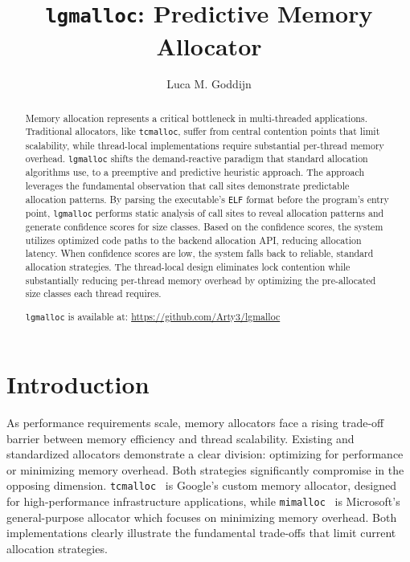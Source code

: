 \documentclass[sigconf,authordraft]{acmart}
\begin{document}

\title{\texttt{lgmalloc}: Predictive Memory Allocator}

\author{Luca M. Goddijn}

\begin{abstract}
  Memory allocation represents a critical bottleneck in multi-threaded applications.
  Traditional allocators, like \texttt{tcmalloc}, suffer from central contention points
  that limit scalability, while thread-local implementations require substantial
  per-thread memory overhead.
  \texttt{lgmalloc} shifts the demand-reactive paradigm that standard allocation
  algorithms use, to a preemptive and predictive heuristic approach.
  The approach leverages the fundamental observation that call sites demonstrate
  predictable allocation patterns.
  By parsing the executable's \texttt{ELF} format before the program's entry point,
  \texttt{lgmalloc} performs static analysis of call sites to reveal allocation
  patterns and generate confidence scores for size classes. Based on the confidence
  scores, the system utilizes optimized code paths to the backend allocation API,
  reducing allocation latency. When confidence scores are low, the system falls back to
  reliable, standard allocation strategies. The thread-local design eliminates lock
  contention while substantially reducing per-thread memory overhead by optimizing
  the pre-allocated size classes each thread requires.

  \texttt{lgmalloc} is available at: \url{https://github.com/Arty3/lgmalloc}
\end{abstract}


\maketitle

\section{Introduction}

As performance requirements scale, memory allocators face a rising trade-off barrier
between memory efficiency and thread scalability. Existing and standardized allocators
demonstrate a clear division: optimizing for performance or minimizing memory overhead.
Both strategies significantly compromise in the opposing dimension.
\texttt{tcmalloc}~\cite{tcmalloc} is Google's custom memory allocator, designed for
high-performance infrastructure applications, while \texttt{mimalloc}~\cite{mimalloc2019}
is Microsoft's general-purpose allocator which focuses on minimizing memory overhead.
Both implementations clearly illustrate the fundamental trade-offs that limit current
allocation strategies.
\end{document}
